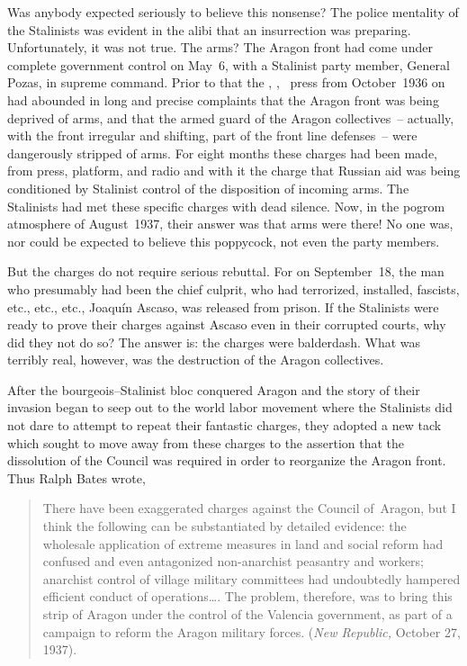 Was anybody expected seriously to believe this nonsense? The police mentality of the Stalinists was evident in the alibi that an insurrection was preparing. Unfortunately\kn, it was not true. The arms? The Aragon front had come under complete government control on May~6, with a Stalinist party member\kn, General Pozas, in supreme command. Prior to that the \CNT\kn, \POUM\kn, \FAI\ press from October~1936 on had abounded in long and precise complaints that the Aragon front was being deprived of arms, and that the armed guard of the Aragon collectives~-- actually\kn, with the front irregular and shifting, part of the front line defenses~-- were dangerously stripped of arms. For eight months these charges had been made, from press, platform, and radio and with it the charge that Russian aid was being conditioned by Stalinist control of the disposition of incoming arms. The Stalinists had met these specific charges with dead silence. Now, in the pogrom atmosphere of August~1937\kn, their answer was that arms were there! No one was, nor could be expected to believe this poppycock, not even the party members.

But the charges do not require serious rebuttal. For on September~18, the man who presumably had been the chief culprit, who had terrorized, installed, fascists, etc., etc., etc., Joaqu\'in Ascaso, was released from prison. If the Stalinists were ready to prove their charges against Ascaso even in their corrupted courts, why did they not do so? The answer is: the charges were balderdash. What was terribly real, however, was the destruction of the Aragon collectives.

After the bourgeois--Stalinist bloc conquered Aragon and the story of their invasion began to seep out to the world labor movement where the Stalinists did not dare to attempt to repeat their fantastic charges, they adopted a new tack which sought to move away from these charges to the assertion that the dissolution of the Council was required in order to reorganize the Aragon front. Thus Ralph Bates wrote,

\begin{quotation}
  There have been exaggerated charges against the Council of~Aragon, but I think the following can be substantiated by detailed evidence: the wholesale application of extreme measures in land and social reform had confused and even antagonized non-anarchist peasantry and workers; anarchist control of village military committees had undoubtedly hampered efficient conduct of operations\dots.
  The problem, therefore, was to bring this strip of Aragon under the control of the Valencia government, as part of a campaign to reform the Aragon military forces. (\emph{New Republic,} October 27, 1937).
\end{quotation}

